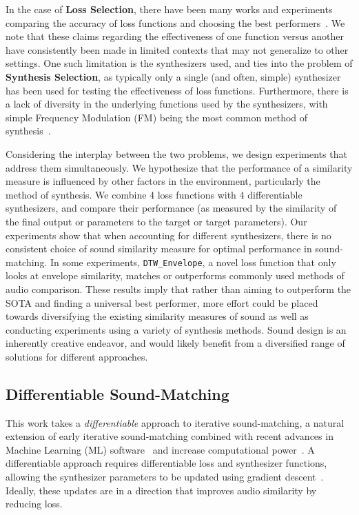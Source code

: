 \documentclass[lettersize,journal]{IEEEtran}
\providecommand{\gls}[1]{#1}
\newcommand{\DTWEnv}{\texttt{DTW\_Envelope}}
\newcommand{\LossSelect}{\textbf{Loss Selection}}
\newcommand{\SynthSelect}{\textbf{Synthesis Selection}}
\begin{document}
In the case of \LossSelect, there have been many works and experiments comparing the accuracy of loss functions and choosing the best performers~\cite{vahidi2023mesostructures,turian2020sorry,engel2020ddsp,uzrad2024diffmoog,han2023perceptual,masuda2021soundmatch,turian2020sorry,bruford2024synthesizer}.  We note that these claims regarding the effectiveness of one function versus another have consistently been made in limited contexts that may not generalize to other settings. One such limitation is the synthesizers used, and ties into the problem of \SynthSelect, as typically only a single (and often, simple) synthesizer has been used for testing the effectiveness of loss functions. Furthermore, there is a lack of diversity in the underlying functions used by the synthesizers, with simple Frequency Modulation (\gls{FM}) being the most common method of synthesis~\cite{horner1993machine,vahidi2023mesostructures,mitchell2007evolutionary,caspe2023envelope}. 

Considering the interplay between the two problems, we design experiments that address them simultaneously. We hypothesize that the performance of a similarity measure is influenced by other factors in the environment, particularly the method of synthesis. We combine 4 loss functions with 4 differentiable synthesizers, and compare their performance (as measured by the similarity of the final output or parameters to the target or target parameters). Our experiments show that when accounting for different synthesizers, there is no consistent choice of sound similarity measure for optimal performance in sound-matching. In some experiments, \DTWEnv, a novel loss function that only looks at envelope similarity, matches or outperforms commonly used methods of audio comparison. These results imply that rather than aiming to outperform the SOTA and finding a universal best performer, more effort could be placed towards diversifying the existing similarity measures of sound as well as conducting experiments using a variety of synthesis methods. Sound design is an inherently creative endeavor, and would likely benefit from a diversified range of solutions for different approaches. 

\subsection{Differentiable Sound-Matching}
This work takes a \textit{differentiable} approach to iterative sound-matching, a natural extension of early iterative sound-matching combined with recent advances in Machine Learning (\gls{ML}) software~\cite{braun2024dac,paszke2019pytorch} and increase computational power~\cite{moore2012introduction,schaller1997moore}. A differentiable approach requires differentiable loss and synthesizer functions, allowing the synthesizer parameters to be updated using gradient descent~\cite{goodfellow2016deep,boyd2004convex}. Ideally, these updates are in a direction that improves audio similarity by reducing loss. 
 
\end{document}
